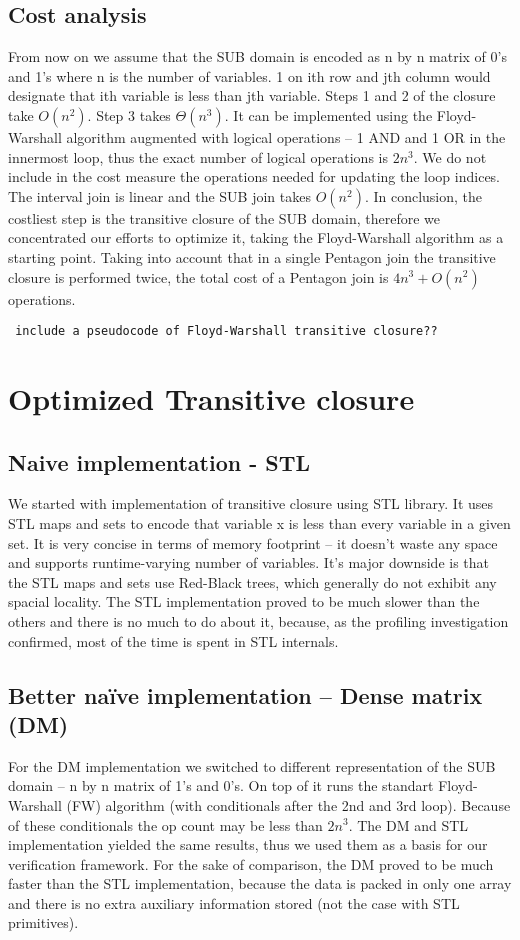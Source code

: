 \documentclass[letterpaper]{article}
\begin{document}
\subsection{Cost analysis}
From now on we assume that the SUB domain is encoded as n by n matrix of 0's and 1's 
where n is the number of variables. 1 on ith row and jth column would designate 
that ith variable is less than jth variable. Steps 1 and 2 of the closure 
take \(O(n^2)\). Step 3 takes \(\Theta(n^3)\). It can be implemented using the Floyd-Warshall 
algorithm \cite{Floyd1962} augmented with logical operations – 1 AND and 1 OR in the innermost 
loop, thus the exact number of logical operations is \(2n^3\). We do not include in the cost measure
the operations needed for updating the loop indices. The interval join is 
linear and the SUB join takes \(O(n^2)\). In conclusion, the costliest step is 
the transitive closure of the SUB domain, therefore we concentrated our efforts 
to optimize it, taking the Floyd-Warshall algorithm as a starting point. 
Taking into account that in a single Pentagon join the transitive closure is 
performed twice, the total cost of a Pentagon join is \(4n^3 + O(n^2)\) operations.

\texttt{ include a pseudocode of Floyd-Warshall transitive closure?? }

\section{Optimized Transitive closure}\label{sec:yourmethod}


\subsection{Naive implementation - STL}
We started with implementation of transitive closure using STL library. 
It uses STL maps and sets to encode that variable x is less than every 
variable in a given set. It is very concise in terms of memory 
footprint -- it doesn't waste any space and supports runtime-varying 
number of variables. It's major downside is that the STL maps and sets 
use Red-Black trees, which generally do not exhibit any spacial locality. 
The STL implementation proved to be much slower than the others and there 
is no much to do about it, because, as the profiling investigation 
confirmed, most of the time is spent in STL internals.

\subsection{Better naïve implementation – Dense matrix (DM)}
For the DM implementation we switched to different representation of the 
SUB domain – n by n matrix of 1's and 0's. On top of it runs the standart 
Floyd-Warshall (FW) algorithm (with conditionals after the 2nd and 3rd loop). 
Because of these conditionals the op count may be less than \(2n^3\). The DM 
and STL implementation yielded the same results, thus we used them as a 
basis for our verification framework. For the sake of comparison, the DM 
proved to be much faster than the STL implementation, because the data is 
packed in only one array and there is no extra auxiliary information stored (not the case with STL primitives).
\end{document}
